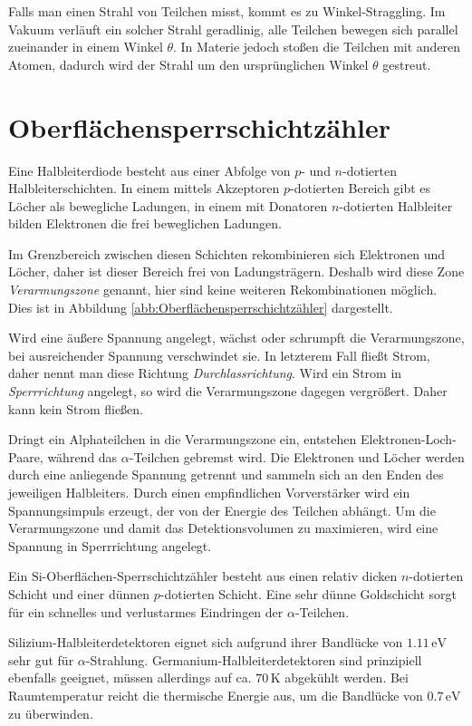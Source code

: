 \documentclass[12pt,a4paper]{scrartcl}
\numberwithin{equation}{section} %
\renewcommand{\[}{} %
\renewcommand{\]}{\noindent} %
\begin{document}
Falls man einen Strahl von Teilchen misst, kommt es zu
Winkel-Straggling. Im Vakuum verläuft ein solcher Strahl geradlinig,
alle Teilchen bewegen sich parallel zueinander in einem Winkel
$\theta$. In Materie jedoch stoßen die Teilchen mit anderen Atomen,
dadurch wird der Strahl um den ursprünglichen Winkel $\theta$
gestreut.

\hypertarget{oberfluxe4chensperrschichtzuxe4hler}{%
\section{Oberflächensperrschichtzähler}\label{oberfluxe4chensperrschichtzuxe4hler}}

Eine Halbleiterdiode besteht aus einer Abfolge von $p$- und
$n$-dotierten Halbleiterschichten. In einem mittels Akzeptoren
$p$-dotierten Bereich gibt es Löcher als bewegliche Ladungen, in einem
mit Donatoren $n$-dotierten Halbleiter bilden Elektronen die frei
beweglichen Ladungen.

Im Grenzbereich zwischen diesen Schichten rekombinieren sich Elektronen
und Löcher, daher ist dieser Bereich frei von Ladungsträgern. Deshalb
wird diese Zone \emph{Verarmungszone} genannt, hier sind keine weiteren
Rekombinationen möglich. Dies ist in Abbildung \ref{abb:Oberflächensperrschichtzähler} dargestellt.

Wird eine äußere Spannung angelegt, wächst oder schrumpft die
Verarmungszone, bei ausreichender Spannung verschwindet sie. In
letzterem Fall fließt Strom, daher nennt man diese Richtung
\emph{Durchlassrichtung}. Wird ein Strom in \emph{Sperrrichtung}
angelegt, so wird die Verarmungszone dagegen vergrößert. Daher kann kein
Strom fließen.

Dringt ein Alphateilchen in die Verarmungszone ein, entstehen
Elektronen-Loch-Paare, während das $\alpha$-Teilchen gebremst wird.
Die Elektronen und Löcher werden durch eine anliegende Spannung getrennt
und sammeln sich an den Enden des jeweiligen Halbleiters. Durch einen
empfindlichen Vorverstärker wird ein Spannungsimpuls erzeugt, der von
der Energie des Teilchen abhängt. Um die Verarmungszone und damit das
Detektionsvolumen zu maximieren, wird eine Spannung in Sperrrichtung
angelegt.

Ein $\mathrm{Si}$-Oberflächen-Sperrschichtzähler besteht aus einen
relativ dicken $n$-dotierten Schicht und einer dünnen $p$-dotierten
Schicht. Eine sehr dünne Goldschicht sorgt für ein schnelles und
verlustarmes Eindringen der $\alpha$-Teilchen.

Silizium-Halbleiterdetektoren eignet sich aufgrund ihrer Bandlücke von
$1.11\mathrm{\,eV}$ sehr gut für $\alpha$-Strahlung.
Germanium-Halbleiterdetektoren sind prinzipiell ebenfalls geeignet,
müssen allerdings auf ca. $70\,\mathrm K$ abgekühlt werden. Bei
Raumtemperatur reicht die thermische Energie aus, um die Bandlücke von
$0.7\mathrm{\,eV}$ zu überwinden.
\end{document}
